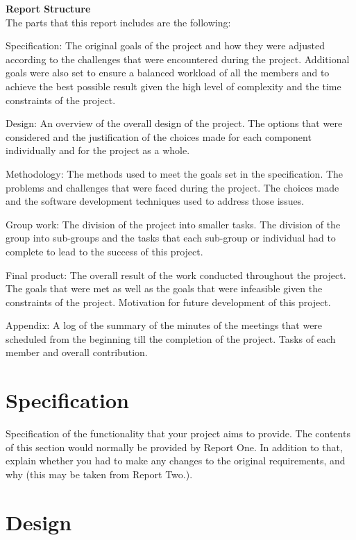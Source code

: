 \documentclass[a4paper,11pt]{article}
\begin{document}
\noindent
\textbf{Report Structure}\\
\noindent
The parts that this report includes are the following:


Specification: The original goals of the project and how they were adjusted according to the challenges that were encountered during the project. Additional goals were also set to ensure a balanced workload of all the members and to achieve the best possible result given the high level of complexity and the time constraints of the project.

Design: An overview of the overall design of the project. The options that were considered and the justification of the choices made for each component individually and for the project as a whole.

Methodology: The methods used to meet the goals set in the specification. The problems and challenges that were faced during the project. The choices made and the software development techniques used to address those issues.

Group work: The division of the project into smaller tasks. The division of the group into sub-groups and the tasks that each sub-group or individual had to complete to lead to the success of this project.

Final product: The overall result of the work conducted throughout the project. The goals that were met as well as the goals that were infeasible given the constraints of the project. Motivation for future development of this project.

Appendix: A log of the summary of the minutes of the meetings that were scheduled from the beginning till the completion of the project. Tasks of each member and overall contribution. 

\clearpage
\section{Specification}

Specification of the functionality that your project aims to provide. The
contents of this section would normally be provided by Report One. In 
addition to that, explain whether you had to make any changes to the original
requirements, and why (this may be taken from Report Two.). 


\clearpage
\section{Design}
\end{document}
